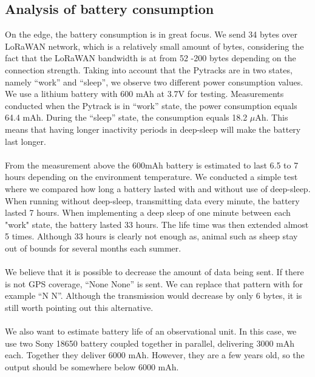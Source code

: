 	\subsection{Analysis of battery consumption}
		On the edge, the battery consumption is in great focus. We send 34 bytes over LoRaWAN network, which is a relatively small amount of bytes, considering the fact that the LoRaWAN bandwidth is at from 52 -200 bytes depending on the connection strength. Taking into account that the Pytracks are in two states, namely “work” and “sleep”, we observe two different power consumption values. We use a lithium battery with 600 mAh at 3.7V for testing. Measurements conducted when the Pytrack is in “work” state, the power consumption equals 64.4 mAh. During the “sleep” state, the consumption equals 18.2 $\mu$Ah. This means that having longer inactivity periods in deep-sleep will make the battery last longer.\\\\
		From the measurement above the 600mAh battery is estimated to last 6.5 to 7 hours depending on the environment temperature. We conducted a simple test where we compared how long a battery lasted with and without use of deep-sleep. When running without deep-sleep, transmitting data every minute, the battery lasted 7 hours. When implementing a deep sleep of one minute between each "work" state, the battery lasted 33 hours. The life time was then extended almost 5 times. Although 33 hours is clearly not enough as, animal such as sheep stay out of bounds for several months each summer. 
		\\\\
		We believe that it is possible to decrease the amount of data being sent. If there is not GPS coverage, “None None” is sent. We can replace that pattern with for example “N N”. Although the transmission would decrease by only 6 bytes, it is still worth pointing out this alternative. 
		\\\\
		We also want to estimate battery life of an observational unit. In this case, we use two Sony 18650 battery coupled together in parallel, delivering 3000 mAh each. Together they deliver 6000 mAh. However, they are a few years old, so the output should be somewhere below 6000 mAh.
		
